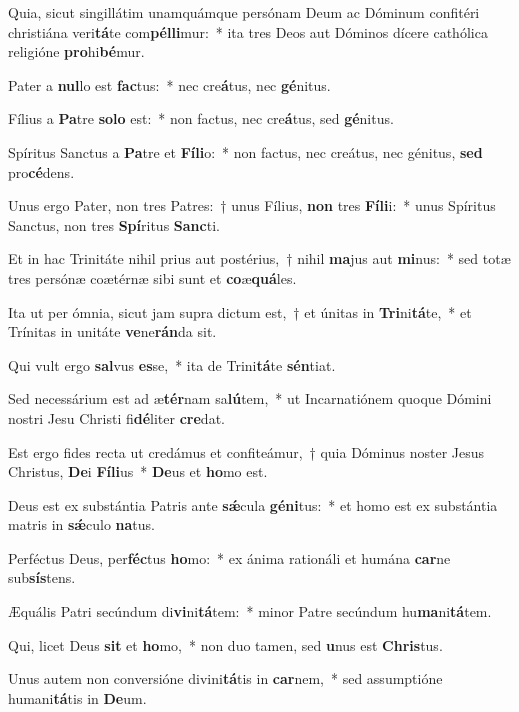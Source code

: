 \item Quia, sicut singillátim unamquámque persónam Deum ac Dóminum confitéri christiána veri\textbf{tá}te com\textbf{pél}\textbf{li}mur:~* ita tres Deos aut Dóminos dícere cathólica religióne \textbf{pro}hi\textbf{bé}mur.
\item Pater a \textbf{nul}lo est \textbf{fac}tus:~* nec cre\textbf{á}tus, nec \textbf{gé}nitus.
\item Fílius a \textbf{Pa}tre \textbf{so}\textbf{lo} est:~* non factus, nec cre\textbf{á}tus, sed \textbf{gé}nitus.
\item Spíritus Sanctus a \textbf{Pa}tre et \textbf{Fí}\textbf{li}o:~* non factus, nec creátus, nec génitus, \textbf{sed} pro\textbf{cé}dens.
\item Unus ergo Pater, non tres Patres:~† unus Fílius, \textbf{non} tres \textbf{Fí}\textbf{li}i:~* unus Spíritus Sanctus, non tres \textbf{Spí}ritus \textbf{Sanc}ti.
\item Et in hac Trinitáte nihil prius aut postérius,~† nihil \textbf{ma}jus aut \textbf{mi}nus:~* sed totæ tres persónæ coætérnæ sibi sunt et \textbf{co}æ\textbf{quá}les.
\item Ita ut per ómnia, sicut jam supra dictum est,~† et únitas in \textbf{Tri}ni\textbf{tá}te,~* et Trínitas in unitáte \textbf{ve}ne\textbf{rán}da sit.
\item Qui vult ergo \textbf{sal}vus \textbf{es}se,~* ita de Trini\textbf{tá}te \textbf{sén}tiat.
\item Sed necessárium est ad æ\textbf{tér}nam sa\textbf{lú}tem,~* ut Incarnatiónem quoque Dómini nostri Jesu Christi fi\textbf{dé}liter \textbf{cre}dat.
\item Est ergo fides recta ut credámus et confiteámur,~† quia Dóminus noster Jesus Christus, \textbf{De}i \textbf{Fí}\textbf{li}us~* \textbf{De}us et \textbf{ho}mo est.
\item Deus est ex substántia Patris ante \textbf{sǽ}cula \textbf{gé}\textbf{ni}tus:~* et homo est ex substántia matris in \textbf{sǽ}culo \textbf{na}tus.
\item Perféctus Deus, per\textbf{féc}tus \textbf{ho}mo:~* ex ánima rationáli et humána \textbf{car}ne sub\textbf{sís}tens.
\item Æquális Patri secúndum di\textbf{vi}ni\textbf{tá}tem:~* minor Patre secúndum hu\textbf{ma}ni\textbf{tá}tem.
\item Qui, licet Deus \textbf{sit} et \textbf{ho}mo,~* non duo tamen, sed \textbf{u}nus est \textbf{Chris}tus.
\item Unus autem non conversióne divini\textbf{tá}tis in \textbf{car}nem,~* sed assumptióne humani\textbf{tá}tis in \textbf{De}um.
